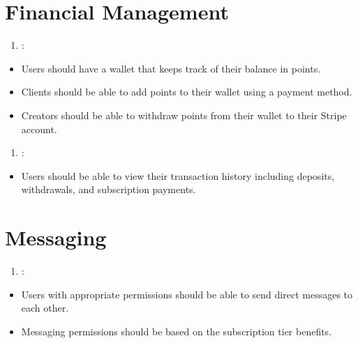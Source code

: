 \documentclass[letterpaper,10pt,english]{sphinxmanual}
\begin{document}
\section{Financial Management}
\label{\detokenize{modules/requirements:financial-management}}\begin{enumerate}
%
\setcounter{enumi}{11}
\item {} 
\sphinxAtStartPar
{}:

\end{enumerate}
\begin{itemize}
\item {} 
\sphinxAtStartPar
Users should have a wallet that keeps track of their balance in points.

\item {} 
\sphinxAtStartPar
Clients should be able to add points to their wallet using a payment method.

\item {} 
\sphinxAtStartPar
Creators should be able to withdraw points from their wallet to their Stripe account.

\end{itemize}
\begin{enumerate}
%
\setcounter{enumi}{12}
\item {} 
\sphinxAtStartPar
{}:

\end{enumerate}
\begin{itemize}
\item {} 
\sphinxAtStartPar
Users should be able to view their transaction history including deposits, withdrawals, and subscription payments.

\end{itemize}


\section{Messaging}
\label{\detokenize{modules/requirements:messaging}}\begin{enumerate}
%
\setcounter{enumi}{13}
\item {} 
\sphinxAtStartPar
{}:

\end{enumerate}
\begin{itemize}
\item {} 
\sphinxAtStartPar
Users with appropriate permissions should be able to send direct messages to each other.

\item {} 
\sphinxAtStartPar
Messaging permissions should be based on the subscription tier benefits.

\end{itemize}
\end{document}
